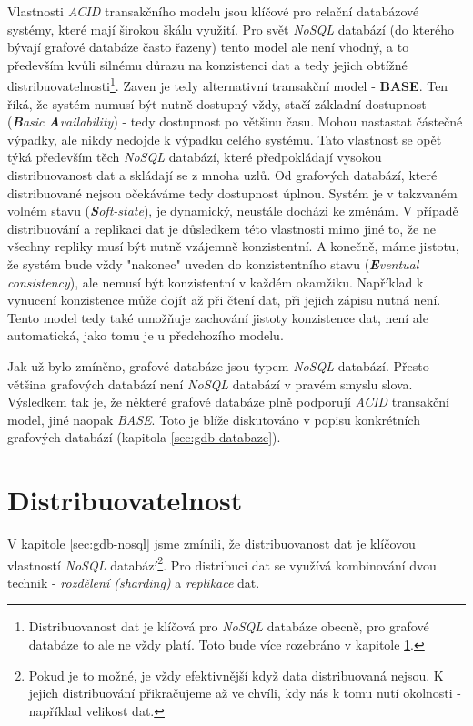 Vlastnosti \textit{ACID} transakčního modelu jsou klíčové pro relační databázové systémy, které mají širokou škálu využití. Pro svět \textit{NoSQL} databází (do kterého bývají grafové databáze často řazeny) tento model ale není vhodný, a to především kvůli silnému důrazu na konzistenci dat a tedy jejich obtížné distribuovatelnosti\footnote{Distribuovanost dat je klíčová pro \textit{NoSQL} databáze obecně, pro grafové databáze to ale ne vždy platí. Toto bude více rozebráno v kapitole \ref{sec:gdb-distribution}.}. Zaven je tedy alternativní transakční model - \textbf{BASE}. Ten říká, že systém numusí být nutně dostupný vždy, stačí základní dostupnost (\textit{\textbf{B}asic \textbf{A}vailability}) - tedy dostupnost po většinu času. Mohou nastastat částečné výpadky, ale nikdy nedojde k výpadku celého systému. Tato vlastnost se opět týká především těch \textit{NoSQL} databází, které předpokládají vysokou distribuovanost dat a skládají se z mnoha uzlů. Od grafových databází, které distribuované nejsou očekáváme tedy dostupnost úplnou. Systém je v takzvaném volném stavu (\textit{\textbf{S}oft-state}), je dynamický, neustále docházi ke změnám. V případě distribuování a replikaci dat je důsledkem této vlastnosti mimo jiné to, že ne všechny repliky musí být nutně vzájemně konzistentní. A konečně, máme jistotu, že systém bude vždy "nakonec" uveden do konzistentního stavu (\textit{\textbf{E}ventual consistency}), ale nemusí být konzistentní v každém okamžiku. Například k vynucení konzistence může dojít až při čtení dat, při jejich zápisu nutná není. Tento model tedy také umožňuje zachování jistoty konzistence dat, není ale automatická, jako tomu je u předchozího modelu. \cite{Sadalage13}

Jak už bylo zmíněno, grafové databáze jsou typem \textit{NoSQL} databází. Přesto většina grafových databází není \textit{NoSQL} databází v pravém smyslu slova. Výsledkem tak je, že některé grafové databáze plně podporují \textit{ACID} transakční model, jiné naopak \textit{BASE}. Toto je blíže diskutováno v popisu konkrétních grafových databází (kapitola \ref{sec:gdb-databaze}).

\section{Distribuovatelnost}
\label{sec:gdb-distribution}
V kapitole \ref{sec:gdb-nosql} jsme zmínili, že distribuovanost dat je klíčovou vlastností \textit{NoSQL} databází\footnote{Pokud je to možné, je vždy efektivnější když data distribuovaná nejsou. K jejich distribuování přikračujeme až ve chvíli, kdy nás k tomu nutí okolnosti - například velikost dat.}. Pro distribuci dat se využívá kombinování dvou technik - \textit{rozdělení (sharding)} a \textit{replikace} dat.

